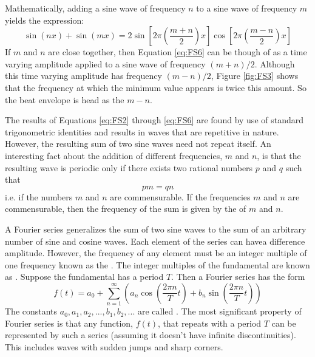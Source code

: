 \documentclass[12pt, a4paper, oneside, openright, titlepage]{book}
\begin{document}
Mathematically, adding a sine wave of frequency $n$ to a sine wave of frequency $m$ yields the expression: \begin{equation}\label{eq:FS6}
    \sin(nx) + \sin(mx) = 2\sin\left[2\pi\left(\frac{m+n}{2}\right)x\right]\cos\left[2\pi\left(\frac{m-n}{2}\right)x\right]
\end{equation}
If $m$ and $n$ are close together, then Equation \ref{eq:FS6} can be though of as a time varying amplitude applied to a sine wave of frequency $(m+n)/2$. Although this time varying amplitude has frequency $(m-n)/2$, Figure \ref{fig:FS3} shows that the frequency at which the minimum value appears is twice this amount. So the beat envelope is head as the $m-n$.

\noindent The results of Equations \ref{eq:FS2} through \ref{eq:FS6} are found by use of standard trigonometric identities and results in waves that are repetitive in nature. However, the resulting sum of two sine waves need not repeat itself. An interesting fact about the addition of different frequencies, $m$ and $n$, is that the resulting wave is periodic only if there exists two rational numbers $p$ and $q$ such that \begin{equation}\label{eq:FS7}
    pm = qn
\end{equation}
i.e. if the numbers $m$ and $n$ are commensurable. If the frequencies $m$ and $n$ are commensurable, then the frequency of the sum is given by the  of $m$ and $n$.

\noindent A Fourier series generalizes the sum of two sine waves to the sum of an arbitrary number of sine and cosine waves. Each element of the series can havea difference amplitude. However, the frequency of any element must be an integer multiple of one frequency known as the . The integer multiples of the fundamental are known as . Suppose the fundamental has a period $T$. Then a Fourier series has the form \begin{equation}\label{eq:FS8}
    f(t) = a_0 + \sum_{n=1}^{\infty}\left(a_n\cos\left(\frac{2\pi n}{T}t\right) + b_n\sin\left(\frac{2\pi n}{T}t\right)\right)
\end{equation}
The constants $a_0,a_1,a_2,...,b_1,b_2,...$ are called . The most significant property of Fourier series is that any function, $f(t)$, that repeats with a period $T$ can be represented by such a series (assuming it doesn't have infinite discontinuities). This includes waves with sudden jumps and sharp corners.
\end{document}
